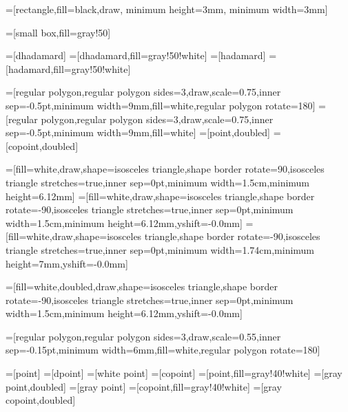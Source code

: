 =[rectangle,fill=black,draw, minimum height=3mm, minimum width=3mm]

=[small box,fill=gray!50]

=[dhadamard]
=[dhadamard,fill=gray!50!white]
=[hadamard]
=[hadamard,fill=gray!50!white]

=[regular polygon,regular polygon sides=3,draw,scale=0.75,inner sep=-0.5pt,minimum width=9mm,fill=white,regular polygon rotate=180]
=[regular polygon,regular polygon sides=3,draw,scale=0.75,inner sep=-0.5pt,minimum width=9mm,fill=white]
=[point,doubled]
=[copoint,doubled]

=[fill=white,draw,shape=isosceles triangle,shape border rotate=90,isosceles triangle stretches=true,inner sep=0pt,minimum width=1.5cm,minimum height=6.12mm]
=[fill=white,draw,shape=isosceles triangle,shape border rotate=-90,isosceles triangle stretches=true,inner sep=0pt,minimum width=1.5cm,minimum height=6.12mm,yshift=-0.0mm]
=[fill=white,draw,shape=isosceles triangle,shape border rotate=-90,isosceles triangle stretches=true,inner sep=0pt,minimum width=1.74cm,minimum height=7mm,yshift=-0.0mm]

=[fill=white,doubled,draw,shape=isosceles triangle,shape border rotate=-90,isosceles triangle stretches=true,inner sep=0pt,minimum width=1.5cm,minimum height=6.12mm,yshift=-0.0mm]

=[regular polygon,regular polygon sides=3,draw,scale=0.55,inner sep=-0.15pt,minimum width=6mm,fill=white,regular polygon rotate=180] 

=[point]
=[dpoint]
=[white point] %
=[copoint]
=[point,fill=gray!40!white]
=[gray point,doubled]
=[gray point] %
=[copoint,fill=gray!40!white]
=[gray copoint,doubled]

